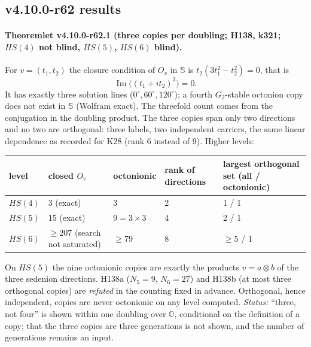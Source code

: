 \subsection*{v4.10.0-r62 results}
\label{subsec:v4100-r62-results}

\paragraph{Theoremlet v4.10.0-r62.1 (three copies per doubling; H138, k321; \(HS(4)\) not blind, \(HS(5)\), \(HS(6)\) blind).}
For \(v=(t_1,t_2)\) the closure condition of \(O_v\) in \(\mathbb S\) is \(t_2(3t_1^2-t_2^2)=0\), that is
\[
\operatorname{Im}\bigl((t_1+i t_2)^3\bigr)=0 .
\]
It has exactly three solution lines (\(0^\circ,60^\circ,120^\circ\)); a fourth \(G_2\)-stable octonion copy does not exist in \(\mathbb S\)
(Wolfram exact).  The threefold count comes from the conjugation in the doubling product.  The three copies span only two directions and no two
are orthogonal: three labels, two independent carriers, the same linear dependence as recorded for K28 (rank 6 instead of 9).  Higher levels:
\begin{center}
\small
\begin{tabular}{@{}lllp{.14\linewidth}p{.24\linewidth}@{}}
\toprule
level & closed \(O_v\) & octonionic & rank of directions & largest orthogonal set (all / octonionic)\\
\midrule
\(HS(4)\) & 3 (exact) & 3 & 2 & 1 / 1\\
\(HS(5)\) & 15 (exact) & \(9=3\times3\) & 4 & 2 / 1\\
\(HS(6)\) & \(\ge 207\) (search not saturated) & \(\ge 79\) & 8 & \(\ge5\) / 1\\
\bottomrule
\end{tabular}
\end{center}
On \(HS(5)\) the nine octonionic copies are exactly the products \(v=a\otimes b\) of the three sedenion directions.  H138a (\(N_5=9\),
\(N_6=27\)) and H138b (at most three orthogonal copies) are \emph{refuted} in the counting fixed in advance.  Orthogonal, hence independent,
copies are never octonionic on any level computed.  \emph{Status:} ``three, not four'' is shown within one doubling over \(\mathbb O\), conditional
on the definition of a copy; that the three copies are three generations is not shown, and the number of generations remains an input.

